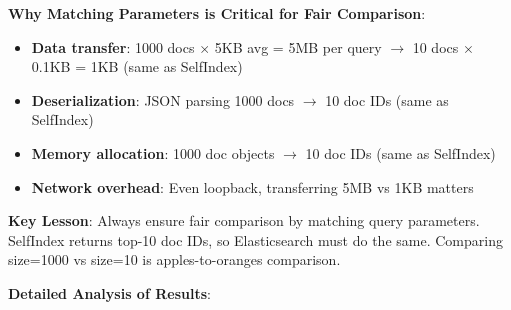 \documentclass[12pt,a4paper]{article}
\begin{document}
\textbf{Why Matching Parameters is Critical for Fair Comparison}:
\begin{itemize}
    \item \textbf{Data transfer}: 1000 docs $\times$ 5KB avg = 5MB per query $\rightarrow$ 10 docs $\times$ 0.1KB = 1KB (same as SelfIndex)
    \item \textbf{Deserialization}: JSON parsing 1000 docs $\rightarrow$ 10 doc IDs (same as SelfIndex)
    \item \textbf{Memory allocation}: 1000 doc objects $\rightarrow$ 10 doc IDs (same as SelfIndex)
    \item \textbf{Network overhead}: Even loopback, transferring 5MB vs 1KB matters
\end{itemize}

\textbf{Key Lesson}: Always ensure fair comparison by matching query parameters. SelfIndex returns top-10 doc IDs, so Elasticsearch must do the same. Comparing size=1000 vs size=10 is apples-to-oranges comparison.

\textbf{Detailed Analysis of Results}:
\end{document}
